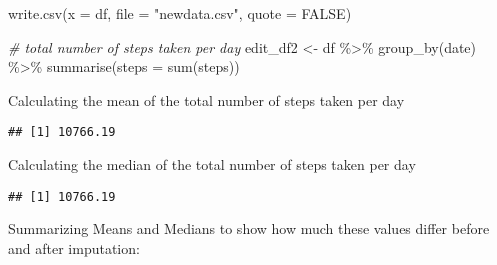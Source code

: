 \documentclass[
]{article}
\newenvironment{Shaded}{\begin{snugshade}}{\end{snugshade}}
\newcommand{\AttributeTok}[1]{\textcolor[rgb]{0.77,0.63,0.00}{#1}}
\newcommand{\CommentTok}[1]{\textcolor[rgb]{0.56,0.35,0.01}{\textit{#1}}}
\newcommand{\ConstantTok}[1]{\textcolor[rgb]{0.00,0.00,0.00}{#1}}
\newcommand{\FunctionTok}[1]{\textcolor[rgb]{0.00,0.00,0.00}{#1}}
\newcommand{\NormalTok}[1]{#1}
\newcommand{\OtherTok}[1]{\textcolor[rgb]{0.56,0.35,0.01}{#1}}
\newcommand{\SpecialCharTok}[1]{\textcolor[rgb]{0.00,0.00,0.00}{#1}}
\newcommand{\StringTok}[1]{\textcolor[rgb]{0.31,0.60,0.02}{#1}}
\begin{document}
\begin{Shaded}
\begin{Highlighting}[]
\FunctionTok{write.csv}\NormalTok{(}\AttributeTok{x =}\NormalTok{ df, }\AttributeTok{file =} \StringTok{"newdata.csv"}\NormalTok{, }\AttributeTok{quote =} \ConstantTok{FALSE}\NormalTok{)}
\end{Highlighting}
\end{Shaded}

\begin{Shaded}
\begin{Highlighting}[]
\CommentTok{\# total number of steps taken per day}
\NormalTok{edit\_df2 }\OtherTok{\textless{}{-}}\NormalTok{ df }\SpecialCharTok{\%\textgreater{}\%} \FunctionTok{group\_by}\NormalTok{(date) }\SpecialCharTok{\%\textgreater{}\%} \FunctionTok{summarise}\NormalTok{(}\AttributeTok{steps =} \FunctionTok{sum}\NormalTok{(steps))}
\end{Highlighting}
\end{Shaded}

Calculating the mean of the total number of steps taken per day

\begin{Shaded}
\end{Shaded}

\begin{verbatim}
## [1] 10766.19
\end{verbatim}

Calculating the median of the total number of steps taken per day

\begin{Shaded}
\end{Shaded}

\begin{verbatim}
## [1] 10766.19
\end{verbatim}

Summarizing Means and Medians to show how much these values differ
before and after imputation:
\end{document}
